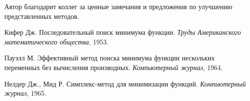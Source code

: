 \documentclass[12pt,a4paper]{article}
\begin{document}
Автор благодарит коллег за ценные замечания и предложения по улучшению представленных методов.

\begin{thebibliography}{9}

Кифер Дж. Последовательный поиск минимума функции. \textit{Труды Американского математического общества}, 1953.

Пауэлл М. Эффективный метод поиска минимума функции нескольких переменных без вычисления производных. \textit{Компьютерный журнал}, 1964.

Нелдер Дж., Мид Р. Симплекс-метод для минимизации функций. \textit{Компьютерный журнал}, 1965.

\end{thebibliography}
\end{document}
